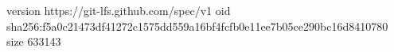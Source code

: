 version https://git-lfs.github.com/spec/v1
oid sha256:f5a0c21473df41272c1575dd559a16bf4fcfb0e11ee7b05ce290bc16d8410780
size 633143
